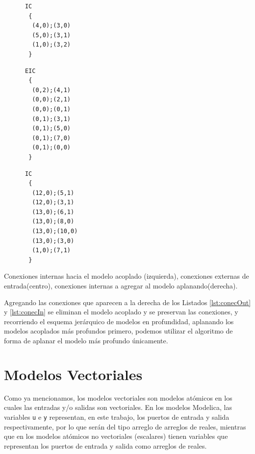 \begin{itemize}
\begin{listing}
\begin{minipage}[t]{0.3\linewidth}
\begin{verbatim}
      IC
       {
        (4,0);(3,0)
        (5,0);(3,1)
        (1,0);(3,2)
       }
\end{verbatim}
\end{minipage}
\begin{minipage}[t]{0.3\linewidth}
\begin{verbatim}
      EIC
       {
        (0,2);(4,1)
        (0,0);(2,1)
        (0,0);(0,1)
        (0,1);(3,1)
        (0,1);(5,0)
        (0,1);(7,0)
        (0,1);(0,0)
       }
\end{verbatim}
\end{minipage}
\begin{minipage}[t]{0.3\linewidth}
\begin{verbatim}
      IC
       {
        (12,0);(5,1)
        (12,0);(3,1)
        (13,0);(6,1)
        (13,0);(8,0)
        (13,0);(10,0)
        (13,0);(3,0)
        (1,0);(7,1)
       }
\end{verbatim}
\end{minipage}
\caption{Conexiones internas hacia el modelo acoplado (izquierda), conexiones externas de entrada(centro), conexiones internas a agregar al modelo aplanando(derecha).}
\label{lst:conecIn}
\end{listing}
\end{itemize}

	Agregando las conexiones que aparecen a la derecha de los Listados \ref{lst:conecOut} y \ref{lst:conecIn} se eliminan el modelo acoplado y se 
	preservan las conexiones, y recorriendo el esquema jerárquico de modelos en profundidad, 
	aplanando los modelos acoplados más profundos primero, podemos utilizar el algoritmo de forma de aplanar el modelo más profundo únicamente.

\section{Modelos Vectoriales} \label{sec:modelos_vectoriales}
	Como ya mencionamos, los modelos vectoriales son modelos atómicos en los cuales las entradas y/o salidas son vectoriales. En los modelos Modelica, 
	las variables \texttt{u} e \texttt{y} representan, en este trabajo, los puertos de entrada y salida respectivamente, por lo que serán del tipo arreglo de arreglos de reales,
	mientras que en los modelos atómicos no vectoriales (escalares) tienen variables que representan los puertos de entrada y salida como arreglos de reales. 

